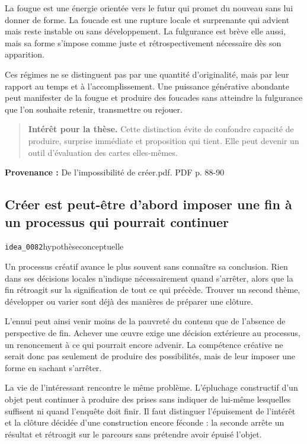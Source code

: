 \documentclass[10pt,a4paper]{article}
\begin{document}
La fougue est une énergie orientée vers le futur qui promet du nouveau sans lui donner de forme. La foucade est une rupture locale et surprenante qui advient mais reste instable ou sans développement. La fulgurance est brève elle aussi, mais sa forme s'impose comme juste et rétrospectivement nécessaire dès son apparition.

Ces régimes ne se distinguent pas par une quantité d'originalité, mais par leur rapport au temps et à l'accomplissement. Une puissance générative abondante peut manifester de la fougue et produire des foucades sans atteindre la fulgurance que l'on souhaite retenir, transmettre ou rejouer.

\begin{quote}
\textbf{Intérêt pour la thèse.} Cette distinction évite de confondre capacité de produire, surprise immédiate et proposition qui tient. Elle peut devenir un outil d'évaluation des cartes elles-mêmes.
\end{quote}
{\footnotesize\color{metadata}\textbf{Provenance :} De l'impossibilité de créer.pdf. PDF p. 88-90\par}

\subsection{Créer est peut-être d'abord imposer une fin à un processus qui pourrait continuer}
{\small\color{metadata} \texttt{idea\_0082}\quad\textbullet\quad hypothèse\quad\textbullet\quad conceptuelle\par}

Un processus créatif avance le plus souvent sans connaître sa conclusion. Rien dans ses décisions locales n'indique nécessairement quand s'arrêter, alors que la fin rétroagit sur la signification de tout ce qui précède. Trouver un second thème, développer ou varier sont déjà des manières de préparer une clôture.

L'ennui peut ainsi venir moins de la pauvreté du contenu que de l'absence de perspective de fin. Achever une œuvre exige une décision extérieure au processus, un renoncement à ce qui pourrait encore advenir. La compétence créative ne serait donc pas seulement de produire des possibilités, mais de leur imposer une forme en sachant s'arrêter.

La vie de l'intéressant rencontre le même problème. L'épluchage constructif d'un objet peut continuer à produire des prises sans indiquer de lui-même lesquelles suffisent ni quand l'enquête doit finir. Il faut distinguer l'épuisement de l'intérêt et la clôture décidée d'une construction encore féconde : la seconde arrête un résultat et rétroagit sur le parcours sans prétendre avoir épuisé l'objet.
\end{document}
